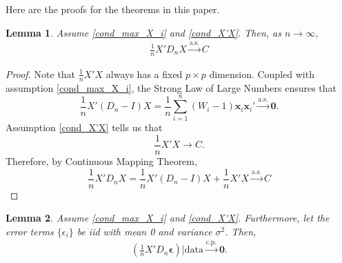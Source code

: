 \documentclass[12pt]{article}
\newcommand{\ep}{\bm{\epsilon}} %
\newcommand{\sumin}{\sum_{i=1}^n} %
\newcommand{\dn}{\frac{1}{n}} %
\newcommand{\CONV}[1]{\stackrel{\text{#1}}{\longrightarrow}} %
\newcommand{\x}{\bm{x}_i} %
\newtheorem{lem}{Lemma}[section]
\begin{document}
Here are the proofs for the theorems in this paper.

\begin{lem} \label{lem_X'DnX}
	Assume \eqref{cond_max_X_i} and \eqref{cond_X'X}. Then, as $n \to \infty$, 
		\begin{align} \label{lemma1result}
		\dn X' D_n X
		\CONV{a.s.} C 
		\end{align}
\end{lem}

\allowdisplaybreaks
\begin{proof}
	Note that $\dn X'X$ always has a fixed $p \times p$ dimension. Coupled with assumption \eqref{cond_max_X_i}, the Strong Law of Large Numbers ensures that 
	$$
	\dn X' (D_n - I) X 
	= \dn \sumin (W_i - 1) \x \x' 
	\CONV{a.s.} \bm{0}.
	$$ 
	Assumption \eqref{cond_X'X} tells us that 
	$$
	\dn X'X
	\to C.
	$$
	Therefore, by Continuous Mapping Theorem,
	$$
	\dn X' D_n X 
	= \dn X' (D_n - I) X + \dn X'X
	\CONV{a.s.} C
	$$ 
\end{proof}

\begin{lem} \label{lem_X'DnEp}
	Assume \eqref{cond_max_X_i} and \eqref{cond_X'X}. Furthermore, let the error terms $\{\epsilon_i\}$ be iid with mean 0 and variance $\sigma^2$. Then,  
	\begin{align}
	\left(
		 \dn X'D_n \ep 
	\right) 
	\bigg| \text{data} 
	\CONV{c.p.} \bm{0}.
	\end{align}   
\end{lem}
\end{document}
